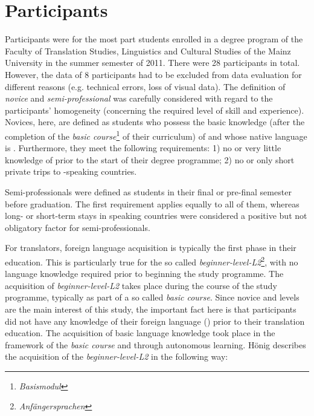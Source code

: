 \documentclass[output=paper]{langsci/langscibook.cls}
\begin{document}
\section{Participants}

Participants were for the most part students enrolled in a degree program of the Faculty of Translation Studies, Linguistics and Cultural Studies of the Mainz University in the summer semester of 2011. There were 28 participants in total. However, the data of 8 participants had to be excluded from data evaluation for different reasons (e.g. technical errors, loss of visual data). The definition of \textit{novice} and \textit{semi-professional} was carefully considered with regard to the participants' homogeneity (concerning the required level of skill and experience). Novices, here, are defined as students who possess the basic knowledge (after the completion of the \textit{basic course}\footnote{\textit{Basismodul}} of their curriculum) of  and whose native language is . Furthermore, they meet the following requirements: 1) no or very little knowledge of  prior to the start of their degree programme; 2) no or only short private trips to -speaking countries. 


Semi-professionals were defined as students in their final or pre-final semester before graduation. The first requirement applies equally to all of them, whereas long- or short-term stays in  speaking countries were considered a positive but not obligatory factor for semi-professionals.


For translators, foreign language acquisition is typically the first phase in their education. This is particularly true for the so called \textit{beginner-level-L2}\footnote{\textit{Anfängersprachen}}, with no language knowledge required prior to beginning the study programme. The acquisition of \textit{beginner-level-L2} takes place during the course of the study programme, typically as part of a so called \textit{basic course}. Since novice and   levels are the main interest of this study, the important fact here is that participants did not have any knowledge of their foreign language () prior to their translation education. The acquisition of basic language knowledge took place in the framework of the \textit{basic course} and through autonomous learning. Hönig describes the acquisition of the \textit{beginner-level-L2} in the following way: 
\end{document}
